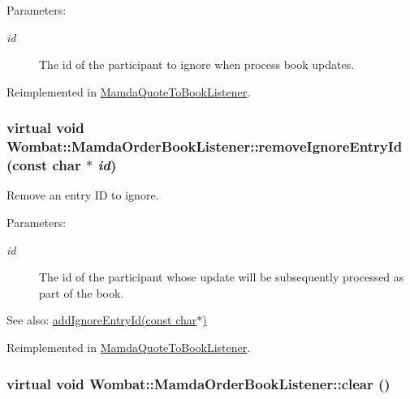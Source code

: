 \begin{Desc}
\item[Parameters:]
\begin{description}
\item[{\em id}]The id of the participant to ignore when process book updates. \end{description}
\end{Desc}


Reimplemented in \hyperlink{classMamdaQuoteToBookListener_fbd741a8aff801ccb953cf7e5056a359}{Mamda\-Quote\-To\-Book\-Listener}.\hypertarget{classWombat_1_1MamdaOrderBookListener_9bd0ec676f02115594f5f29e0f28e3b9}{
\subsubsection[removeIgnoreEntryId]{\setlength{\rightskip}{0pt plus 5cm}virtual void Wombat::Mamda\-Order\-Book\-Listener::remove\-Ignore\-Entry\-Id (const char $\ast$ {\em id})}}
\label{classWombat_1_1MamdaOrderBookListener_9bd0ec676f02115594f5f29e0f28e3b9}


Remove an entry ID to ignore. 

\begin{Desc}
\item[Parameters:]
\begin{description}
\item[{\em id}]The id of the participant whose update will be subsequently processed as part of the book.\end{description}
\end{Desc}
\begin{Desc}
\item[See also:]\hyperlink{classWombat_1_1MamdaOrderBookListener_1d3802c30ebd8939435f74a634dc11fc}{add\-Ignore\-Entry\-Id(const char$\ast$)} \end{Desc}


Reimplemented in \hyperlink{classMamdaQuoteToBookListener_e16ce5ea6ee98985543df7c93cea61f9}{Mamda\-Quote\-To\-Book\-Listener}.\hypertarget{classWombat_1_1MamdaOrderBookListener_9dfecc38256b4bbe71ab35c58cc5ef1a}{
\subsubsection[clear]{\setlength{\rightskip}{0pt plus 5cm}virtual void Wombat::Mamda\-Order\-Book\-Listener::clear ()}}
\label{classWombat_1_1MamdaOrderBookListener_9dfecc38256b4bbe71ab35c58cc5ef1a}


